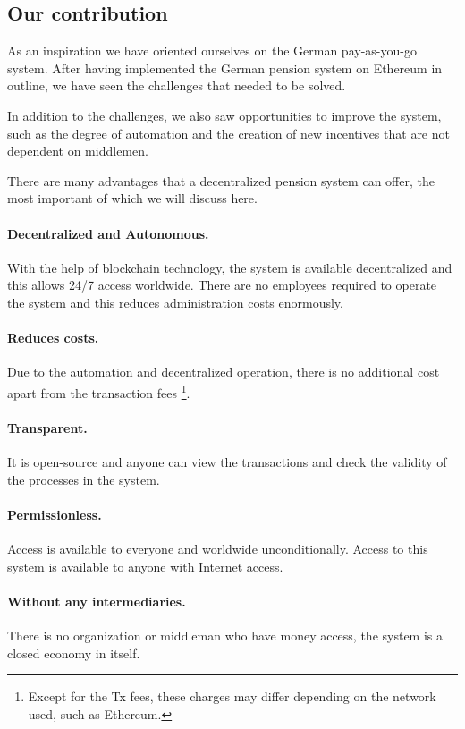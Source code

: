 \subsection{Our contribution}
As an inspiration we have oriented ourselves on the German pay-as-you-go system. After having implemented the German pension system on Ethereum in outline, we have seen the challenges that needed to be solved.

In addition to the challenges, we also saw opportunities to improve the system, such as the degree of automation and the creation of new incentives that are not dependent on middlemen.

There are many advantages that a decentralized pension system can offer, the most important of which we will discuss here.

\paragraph{Decentralized and Autonomous.} With the help of blockchain technology, the system is available decentralized and this allows 24/7 access worldwide. There are no employees required to operate the system and this reduces administration costs enormously.

\paragraph{Reduces costs.} Due to the automation and decentralized operation, there is no additional cost apart from the transaction fees \footnote{Except for the Tx fees, these charges may differ depending on the network used, such as Ethereum.}.

\paragraph{Transparent.} It is open-source and anyone can view the transactions and check the validity of the processes in the system.

\paragraph{Permissionless.} 
Access is available to everyone and worldwide unconditionally. Access to this system is available to anyone with Internet access.

\paragraph{Without any intermediaries.} 
There is no organization or middleman who have money access, the system is a closed economy in itself.

